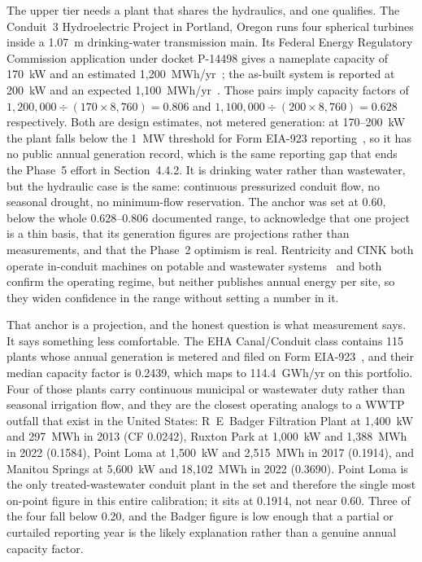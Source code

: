 \documentclass[12pt,letterpaper]{report}
\begin{document}
The upper tier needs a plant that shares the hydraulics, and one qualifies. The
Conduit~3 Hydroelectric Project in Portland, Oregon runs four spherical turbines
inside a 1.07~m drinking-water transmission main. Its Federal Energy Regulatory
Commission application under docket P-14498 gives a nameplate capacity of 170~kW
and an estimated 1{,}200~MWh/yr~\cite{ferc_p14498}; the as-built system is
reported at 200~kW and an expected 1{,}100~MWh/yr~\cite{lucidpipe}. Those pairs
imply capacity factors of $1{,}200{,}000 \div (170 \times 8{,}760) = 0.806$ and
$1{,}100{,}000 \div (200 \times 8{,}760) = 0.628$ respectively. Both are design
estimates, not metered generation: at 170--200~kW the plant falls below the 1~MW
threshold for Form EIA-923 reporting~\cite{eia923}, so it has no public annual
generation record, which is the same reporting gap that ends the Phase~5 effort in
Section~4.4.2. It is drinking water rather
than wastewater, but the hydraulic case is the same: continuous pressurized
conduit flow, no seasonal drought, no minimum-flow reservation. The anchor
was set at 0.60, below the whole 0.628--0.806 documented range, to
acknowledge that one project is a thin basis, that its generation figures are
projections rather than measurements, and that the Phase~2 optimism is real. Rentricity and
CINK both operate in-conduit machines on potable and wastewater
systems~\cite{rentricity, cink} and both confirm the operating regime, but
neither publishes annual energy per site, so they widen confidence in the range
without setting a number in it.

That anchor is a projection, and the honest question is what measurement says. It
says something less comfortable. The EHA Canal/Conduit class contains 115 plants whose
annual generation is metered and filed on Form EIA-923~\cite{hydrosource_eha, eia923},
and their median capacity factor is 0.2439, which maps to 114.4~GWh/yr on this
portfolio. Four of those plants carry continuous municipal or wastewater duty rather
than seasonal irrigation flow, and they are the closest operating analogs to a WWTP
outfall that exist in the United States: R~E~Badger Filtration Plant at 1{,}400~kW and
297~MWh in 2013 (CF 0.0242), Ruxton Park at 1{,}000~kW and 1{,}388~MWh in 2022
(0.1584), Point Loma at 1{,}500~kW and 2{,}515~MWh in 2017 (0.1914), and Manitou
Springs at 5{,}600~kW and 18{,}102~MWh in 2022 (0.3690). Point Loma is the only
treated-wastewater conduit plant in the set and therefore the single most on-point
figure in this entire calibration; it sits at 0.1914, not near 0.60. Three of the four
fall below 0.20, and the Badger figure is low enough that a partial or curtailed
reporting year is the likely explanation rather than a genuine annual capacity factor.
\end{document}
